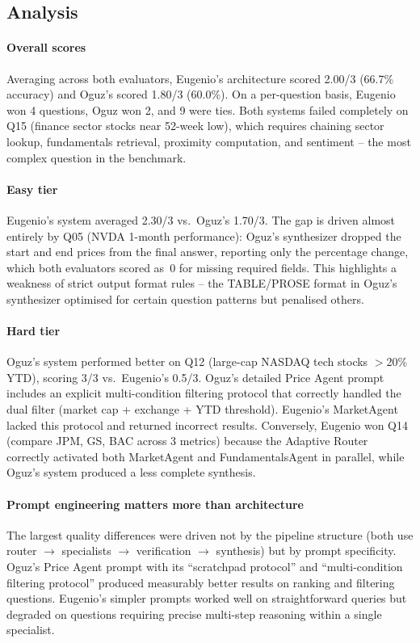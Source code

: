 \documentclass[conference]{IEEEtran}
\begin{document}
\subsection{Analysis}

\paragraph{Overall scores}
Averaging across both evaluators, Eugenio's architecture scored 2.00/3 (66.7\% accuracy)
and Oguz's scored 1.80/3 (60.0\%).  On a per-question basis, Eugenio won 4 questions,
Oguz won 2, and 9 were ties.  Both systems failed completely on Q15 (finance sector
stocks near 52-week low), which requires chaining sector lookup, fundamentals retrieval,
proximity computation, and sentiment -- the most complex question in the benchmark.

\paragraph{Easy tier}
Eugenio's system averaged 2.30/3 vs.\ Oguz's 1.70/3.  The gap is driven almost entirely
by Q05 (NVDA 1-month performance): Oguz's synthesizer dropped the start and end prices
from the final answer, reporting only the percentage change, which both evaluators scored
as~0 for missing required fields.  This highlights a weakness of strict output format
rules -- the TABLE/PROSE format in Oguz's synthesizer optimised for certain question
patterns but penalised others.

\paragraph{Hard tier}
Oguz's system performed better on Q12 (large-cap NASDAQ tech stocks $>$20\% YTD), scoring
3/3 vs.\ Eugenio's 0.5/3.  Oguz's detailed Price Agent prompt includes an explicit
multi-condition filtering protocol that correctly handled the dual filter (market cap +
exchange + YTD threshold).  Eugenio's MarketAgent lacked this protocol and returned
incorrect results.  Conversely, Eugenio won Q14 (compare JPM, GS, BAC across 3 metrics)
because the Adaptive Router correctly activated both MarketAgent and FundamentalsAgent
in parallel, while Oguz's system produced a less complete synthesis.

\paragraph{Prompt engineering matters more than architecture}
The largest quality differences were driven not by the pipeline structure (both use
router $\to$ specialists $\to$ verification $\to$ synthesis) but by prompt specificity.
Oguz's Price Agent prompt with its ``scratchpad protocol'' and ``multi-condition filtering
protocol'' produced measurably better results on ranking and filtering questions.
Eugenio's simpler prompts worked well on straightforward queries but degraded on
questions requiring precise multi-step reasoning within a single specialist.
\end{document}
